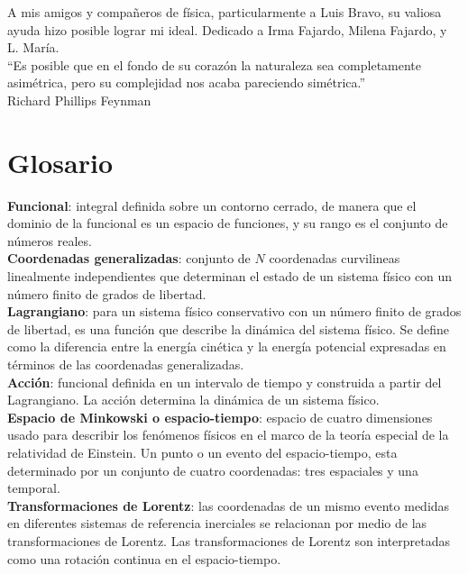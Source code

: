 \documentclass[a4paper,12pt]{article}
\begin{document}
A mis amigos y compañeros de física, particularmente a Luis Bravo, su valiosa ayuda hizo posible lograr mi ideal. 
\newpage
Dedicado a Irma Fajardo, Milena Fajardo, y L. María.
\\

``Es posible que en el fondo de su corazón la naturaleza sea completamente asimétrica, pero su complejidad nos acaba pareciendo simétrica.''
\\

Richard Phillips Feynman


\newpage
\section{Glosario}
\textbf{Funcional}: integral definida sobre un contorno cerrado, de manera que el dominio de la funcional es un espacio de funciones, y su rango es el conjunto de números reales.
\\

\textbf{Coordenadas generalizadas}: conjunto de $N$ coordenadas curvilineas linealmente independientes que determinan el estado de un sistema físico con un número finito de grados de libertad.
\\

\textbf{Lagrangiano}: para un sistema físico conservativo con un número finito de grados de libertad, es una función que describe la dinámica del sistema físico. Se define como la diferencia entre la energía cinética y la energía potencial expresadas en términos de las coordenadas generalizadas.
\\

\textbf{Acción}: funcional definida en un intervalo de tiempo y construida a partir del Lagrangiano. La acción determina la dinámica de un sistema físico.
\\

\textbf{Espacio de Minkowski o espacio-tiempo}: espacio de cuatro dimensiones usado para describir los fenómenos físicos en el marco de la teoría especial de la relatividad de Einstein. Un punto o un evento del espacio-tiempo, esta determinado por un conjunto de cuatro coordenadas: tres espaciales y una temporal. 
\\

\textbf{Transformaciones de Lorentz}: las coordenadas de un mismo evento medidas en diferentes sistemas de referencia inerciales se relacionan por medio de las transformaciones de Lorentz. Las transformaciones de Lorentz son interpretadas como una rotación continua en el espacio-tiempo.
\\
\end{document}
